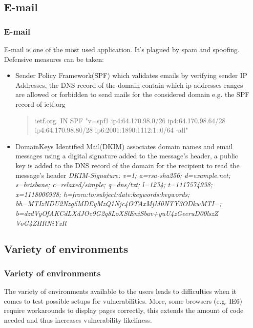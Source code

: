\subsection{E-mail}
\begin{frame}
\frametitle{E-mail}
E-mail is one of the most used application. It's plagued by spam and spoofing. \linebreak
Defensive measures can be taken:
\begin{itemize}
\item Sender Policy Framework(SPF) which validates emails by verifying sender IP Addresses, the DNS record of the domain contain which ip addresses ranges are allowed or forbidden to send mails for the considered domain \linebreak e.g. the SPF record of ietf.org\linebreak
\begin{quote}
ietf.org. IN SPF "v=spf1 ip4:64.170.98.0/26 ip4:64.170.98.64/28 ip4:64.170.98.80/28 ip6:2001:1890:1112:1::0/64 -all"
\end{quote}
\end{itemize}
\end{frame}
\begin{frame}
\begin{itemize}
\item DomainKeys Identified Mail(DKIM) associates domain names and email messages using a digital signature added to the message's header, a public key is added to the DNS record of the domain for the recipient to read the message's header
\textit{DKIM-Signature: v=1; a=rsa-sha256; d=example.net; s=brisbane;
c=relaxed/simple; q=dns/txt; l=1234; t=1117574938; x=1118006938;
h=from:to:subject:date:keywords:keywords;
bh=MTIzNDU2Nzg5MDEyMzQ1Njc4OTAxMjM0NTY3ODkwMTI=;
b=dzdVyOfAKCdLXdJOc9G2q8LoXSlEniSbav+yuU4zGeeruD00lszZ
VoG4ZHRNiYzR}
\end{itemize}
\end{frame}

\subsection{Variety of environments}
\begin{frame}
\frametitle{Variety of environments}
The variety of environments available to the users leads to difficulties when it comes to test possible setups for vulnerabilities. More, some browsers (e.g. IE6) require workarounds to display pages correctly, this extends the amount of code needed and thus increases vulnerability likeliness.
\end{frame}

